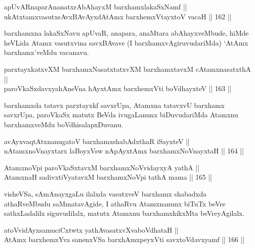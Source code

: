 \begin{shl}
apUvARnaparAnanatxrAbAhayxM barxhamxlakaSxNamf || \\
ukAtxtamxvasutxsAvxBAvAyxdAtAmx barxhemxVtayxtoV vacaH \hfill || 162 ||  
\end{shl}

\begin{artha}
barxhamxna lakaSxNavu apUvaR, anapara, anaMtara abAhayxveMbude, hiMde
heVLida Atamx vasutxvina savxBAvave (I barxhamxvAgiruvudariMda) `AtAmx
barxhamx'veMdu vacanavu.
\end{artha}

\begin{shl}
parxtayxkatxvXM barxhamxNasatxtatxvXM barxhamxtavxM cA\s \s tamxnasatxthA || \\
paroVkaSxdavxyahAneVna hAyxtAmx barxhemxVti boVdhayxteV \hfill || 163 ||  
\end{shl}

\begin{artha}
barxhamxda tatavx parxtayxkf savxrUpa, Atamxna tatavxvU barxhamx
savxrUpa, paroVkaSx matutx BeVda ivugaLanunx biDuvudariMda Atamxnu
barxhamxveMdu boVdhisalapxDuvanu.
\end{artha}


\begin{shl}
avAyxvaqtAtxnanugatoV barxhamxshabAdxthaR iSayxteV ||  \\
nA\s \s tamxnoV\s nayxtarx laBoyxV\s sw nApAyxtAmx barxhamxNoV\s nayxtaH \hfill || 164 ||  
\end{shl}

\begin{shl}
AtamxnoV\s pi paroVkaSxtavxM barxhamxNoV\s vidayxyA yathA || \\
AtamxnaH sadivxtiVyatavxM barxhamxNoV\s pi tathA mama \hfill || 165 ||  
\end{shl}

\begin{artha}
visheVSa, sAmAnayxgaLu ilalxda vasutxveV barxhamx shabadxda
athaRveMbudu saMmatavAgide, I athaRvu Atamxnanunx biTuTx beVre
sathxLadalilx siguvudilalx, matutx Atamxnu barxhamxkikxMta
beVreyAgilalx.
\end{artha}


\begin{shl}
atoV\s vidAyxsamuciCxtwtx yathAvasatxvXvaboVdhataH || \\
AtAmx barxhemxYva sanenxVSa barxhAmxpeyxVti savxtoV\s davxyamf \hfill || 166 ||  
\end{shl}

